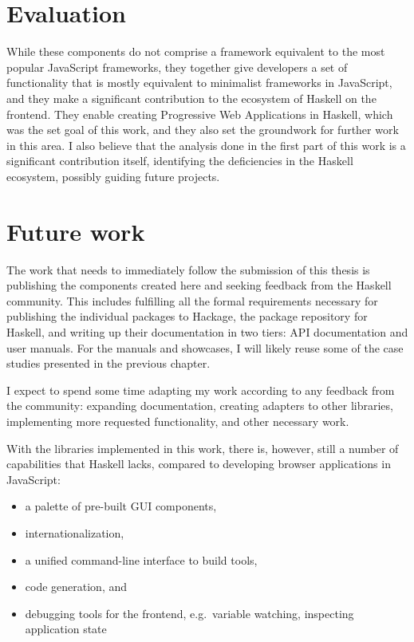 \documentclass[english,zadani,odsaz]{fitthesis}
\begin{document}
\section{Evaluation}
\label{sec:orgd40c3a3}
While these components do not comprise a framework equivalent to the most
popular JavaScript frameworks, they together give developers a set of
functionality that is mostly equivalent to minimalist frameworks in JavaScript,
and they make a significant contribution to the ecosystem of Haskell on the
frontend. They enable creating Progressive Web Applications in Haskell, which
was the set goal of this work, and they also set the groundwork for further work
in this area. I also believe that the analysis done in the first part of this
work is a significant contribution itself, identifying the deficiencies in the
Haskell ecosystem, possibly guiding future projects.

\section{Future work}
\label{sec:org1d95258}
The work that needs to immediately follow the submission of this thesis is
publishing the components created here and seeking feedback from the Haskell
community. This includes fulfilling all the formal requirements necessary for
publishing the individual packages to Hackage, the package repository for
Haskell, and writing up their documentation in two tiers: API documentation and
user manuals. For the manuals and showcases, I will likely reuse some of the
case studies presented in the previous chapter.

I expect to spend some time adapting my work according to any feedback from the
community: expanding documentation, creating adapters to other libraries,
implementing more requested functionality, and other necessary work.

With the libraries implemented in this work, there is, however, still a number of
capabilities that Haskell lacks, compared to developing browser applications in
JavaScript:

\begin{itemize}
\item a palette of pre-built GUI components,
\item internationalization,
\item a unified command-line interface to build tools,
\item code generation, and
\item debugging tools for the frontend, e.g.~variable watching, inspecting application state
\end{itemize}
\end{document}

